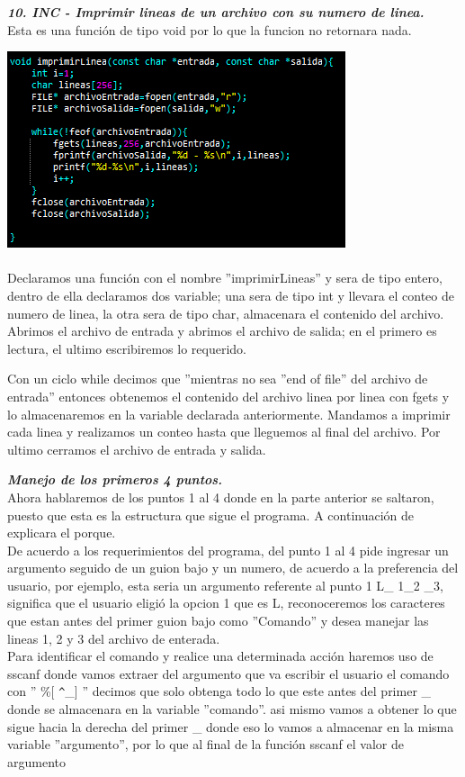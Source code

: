 \documentclass[12pt,letterpaper]{report}
\begin{document}
\textbf{\textit{ 10. INC - Imprimir lineas de un archivo con su numero de linea.}}\\

Esta es una función de tipo void por lo que la funcion no retornara nada.
\begin{multicols}{2}
\includegraphics[scale=0.7]{punto10}\\\\
Declaramos una función con el nombre ''imprimirLineas'' y sera de tipo entero, dentro de ella declaramos dos variable; una sera de tipo int y llevara el conteo de numero de linea, la otra sera de tipo char, almacenara el contenido del archivo. Abrimos el archivo de entrada y abrimos el archivo de salida; en el primero es lectura, el ultimo escribiremos lo requerido. 
\end{multicols}
Con un ciclo while decimos que ''mientras no sea ''end of file'' del archivo de entrada'' entonces obtenemos el contenido del archivo linea por linea con fgets y lo almacenaremos en la variable declarada anteriormente. Mandamos a imprimir cada linea y realizamos un conteo hasta que lleguemos al final del archivo. Por ultimo cerramos el archivo de entrada y salida.

\newpage
\textbf{\textit{ Manejo de los primeros 4 puntos.}}\\

Ahora hablaremos de los puntos 1 al 4 donde en la parte anterior se saltaron, puesto que esta es la estructura que sigue el programa. A continuación de explicara el porque.\\
De acuerdo a los requerimientos del programa, del punto 1 al 4 pide ingresar un argumento seguido de un guion bajo y un numero, de acuerdo a la preferencia del usuario, por ejemplo, esta seria un argumento referente al punto 1 L\_ 1\_2 \_3, significa que el usuario eligió la opcion 1 que es L, reconoceremos los caracteres que estan antes del primer guion bajo como ''Comando'' y desea manejar las lineas 1, 2 y 3 del archivo de enterada.\\
Para identificar el comando y realice una determinada acción haremos uso de sscanf donde vamos extraer del argumento que va escribir el usuario el comando con '' \%[ \verb'^'\_] '' decimos que solo obtenga todo lo que este antes del primer \_ donde se almacenara en la variable ''comando''. asi mismo vamos a obtener lo que sigue hacia la derecha del primer \_ donde eso lo vamos a almacenar en la misma variable ''argumento'', por lo que al final de la función sscanf el valor de argumento \\
\end{document}
